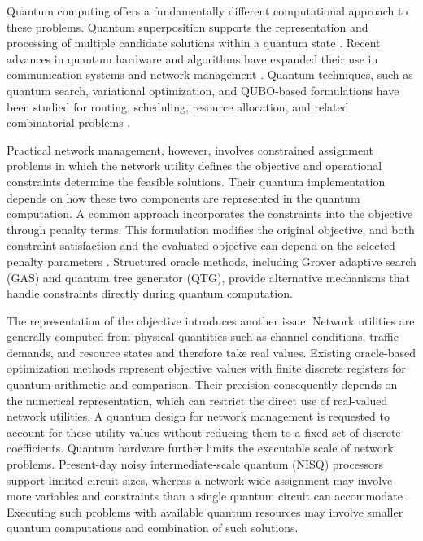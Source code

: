 \documentclass[journal]{IEEEtran}
\begin{document}
{{Quantum computing offers a fundamentally different computational approach to these problems. Quantum superposition supports the representation and processing of multiple candidate solutions within a quantum state \cite{botsinis2019,ngoenriang2023}. Recent advances in quantum hardware and algorithms have expanded their use in communication systems and network management \cite{kim2021heuristic,seo2022}.
Quantum techniques, such as quantum search, variational optimization, and QUBO-based formulations have been studied for routing, scheduling, resource allocation, and related combinatorial problems \cite{ngoenriang2023,fan2022hybrid,gilliam2021gas,fujiwara2025gas}.

Practical network management, however, involves constrained assignment problems in which the network utility defines the objective and operational constraints determine the feasible solutions. Their quantum
implementation depends on how these two components are represented in the quantum computation. A common approach incorporates the constraints into the objective through penalty terms. This formulation modifies the
original objective, and both constraint satisfaction and the evaluated objective can depend on the selected penalty parameters \cite{fan2022hybrid,gilliam2021gas}. Structured oracle methods, including Grover adaptive search (GAS) and quantum tree generator (QTG), provide alternative mechanisms that handle constraints directly during
quantum computation.

The representation of the objective introduces another issue. Network utilities are generally computed from physical quantities such as channel conditions, traffic demands, and resource states and therefore take real values. Existing oracle-based optimization methods represent objective values with finite discrete registers for quantum arithmetic and comparison. Their precision consequently depends on the numerical representation, which can restrict the direct use of real-valued network utilities. A quantum design for network management is requested to account for these utility values without reducing them to a fixed set of discrete coefficients.
Quantum hardware further limits the executable scale of network problems. Present-day noisy intermediate-scale quantum (NISQ) processors support limited circuit sizes, whereas a network-wide assignment may involve more variables and constraints than a single quantum circuit can accommodate \cite{kim2021heuristic,wilkening2025qtg}. Executing such problems with available quantum resources may involve smaller quantum computations and combination of such solutions.

}}
\end{document}
